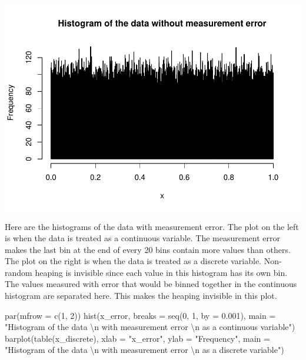 \documentclass[
  11pt,
]{article}
\newenvironment{Shaded}{\begin{snugshade}}{\end{snugshade}}
\newcommand{\AttributeTok}[1]{\textcolor[rgb]{0.77,0.63,0.00}{#1}}
\newcommand{\DecValTok}[1]{\textcolor[rgb]{0.00,0.00,0.81}{#1}}
\newcommand{\FloatTok}[1]{\textcolor[rgb]{0.00,0.00,0.81}{#1}}
\newcommand{\FunctionTok}[1]{\textcolor[rgb]{0.00,0.00,0.00}{#1}}
\newcommand{\NormalTok}[1]{#1}
\newcommand{\SpecialCharTok}[1]{\textcolor[rgb]{0.00,0.00,0.00}{#1}}
\newcommand{\StringTok}[1]{\textcolor[rgb]{0.31,0.60,0.02}{#1}}
\begin{document}
\includegraphics{49045_PB4A7_Report_files/figure-latex/unnamed-chunk-8-1.pdf}

Here are the histograms of the data with measurement error. The plot on
the left is when the data is treated as a continuous variable. The
measurement error makes the last bin at the end of every 20 bins contain
more values than others. The plot on the right is when the data is
treated as a discrete variable. Non-random heaping is invisible since
each value in this histogram has its own bin. The values measured with
error that would be binned together in the continuous histogram are
separated here. This makes the heaping invisible in this plot.

\begin{Shaded}
\begin{Highlighting}[]
\FunctionTok{par}\NormalTok{(}\AttributeTok{mfrow =} \FunctionTok{c}\NormalTok{(}\DecValTok{1}\NormalTok{, }\DecValTok{2}\NormalTok{))}
\FunctionTok{hist}\NormalTok{(x\_error, }\AttributeTok{breaks =} \FunctionTok{seq}\NormalTok{(}\DecValTok{0}\NormalTok{, }\DecValTok{1}\NormalTok{, }\AttributeTok{by =} \FloatTok{0.001}\NormalTok{),}
     \AttributeTok{main =} \StringTok{"Histogram of the data }\SpecialCharTok{\textbackslash{}n}\StringTok{ with measurement error }\SpecialCharTok{\textbackslash{}n}\StringTok{ as a continuous variable"}\NormalTok{)}
\FunctionTok{barplot}\NormalTok{(}\FunctionTok{table}\NormalTok{(x\_discrete), }\AttributeTok{xlab =} \StringTok{"x\_error"}\NormalTok{, }\AttributeTok{ylab =} \StringTok{"Frequency"}\NormalTok{,}
        \AttributeTok{main =} \StringTok{"Histogram of the data }\SpecialCharTok{\textbackslash{}n}\StringTok{ with measurement error }\SpecialCharTok{\textbackslash{}n}\StringTok{ as a discrete variable"}\NormalTok{)}
\end{Highlighting}
\end{Shaded}
\end{document}
